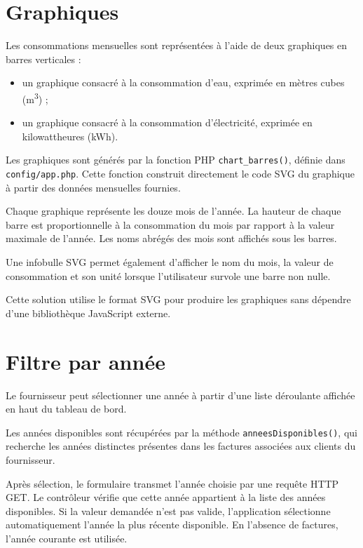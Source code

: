 \section{Graphiques}

Les consommations mensuelles sont représentées à l'aide de deux graphiques en barres verticales :

\begin{itemize}
    \item un graphique consacré à la consommation d'eau, exprimée en mètres cubes (m\textsuperscript{3}) ;
    \item un graphique consacré à la consommation d'électricité, exprimée en kilowattheures (kWh).
\end{itemize}

Les graphiques sont générés par la fonction PHP \texttt{chart\_barres()}, définie dans \texttt{config/app.php}. Cette fonction construit directement le code SVG du graphique à partir des données mensuelles fournies.

Chaque graphique représente les douze mois de l'année. La hauteur de chaque barre est proportionnelle à la consommation du mois par rapport à la valeur maximale de l'année. Les noms abrégés des mois sont affichés sous les barres.

Une infobulle SVG permet également d'afficher le nom du mois, la valeur de consommation et son unité lorsque l'utilisateur survole une barre non nulle.

Cette solution utilise le format SVG pour produire les graphiques sans dépendre d'une bibliothèque JavaScript externe.

\section{Filtre par année}

Le fournisseur peut sélectionner une année à partir d'une liste déroulante affichée en haut du tableau de bord.

Les années disponibles sont récupérées par la méthode \texttt{anneesDisponibles()}, qui recherche les années distinctes présentes dans les factures associées aux clients du fournisseur.

Après sélection, le formulaire transmet l'année choisie par une requête HTTP GET. Le contrôleur vérifie que cette année appartient à la liste des années disponibles. Si la valeur demandée n'est pas valide, l'application sélectionne automatiquement l'année la plus récente disponible. En l'absence de factures, l'année courante est utilisée.

